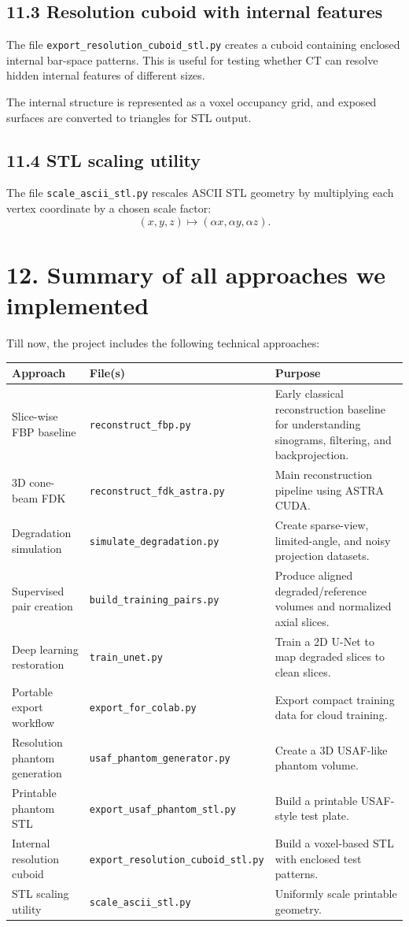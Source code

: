 \documentclass[12pt,a4paper]{article}
\begin{document}
\subsection*{11.3 Resolution cuboid with internal features}
The file \texttt{export\_resolution\_cuboid\_stl.py} creates a cuboid containing enclosed internal bar-space patterns. This is useful for testing whether CT can resolve hidden internal features of different sizes.

The internal structure is represented as a voxel occupancy grid, and exposed surfaces are converted to triangles for STL output.

\subsection*{11.4 STL scaling utility}
The file \texttt{scale\_ascii\_stl.py} rescales ASCII STL geometry by multiplying each vertex coordinate by a chosen scale factor:
\[
(x,y,z) \mapsto (\alpha x, \alpha y, \alpha z).
\]

\section*{12. Summary of all approaches we implemented}
Till now, the project includes the following technical approaches:

\begin{longtable}{|p{3.1cm}|p{4.0cm}|p{7.2cm}|}
\hline
\textbf{Approach} & \textbf{File(s)} & \textbf{Purpose} \\
\hline
Slice-wise FBP baseline & \texttt{reconstruct\_fbp.py} & Early classical reconstruction baseline for understanding sinograms, filtering, and backprojection. \\
\hline
3D cone-beam FDK & \texttt{reconstruct\_fdk\_astra.py} & Main reconstruction pipeline using ASTRA CUDA. \\
\hline
Degradation simulation & \texttt{simulate\_degradation.py} & Create sparse-view, limited-angle, and noisy projection datasets. \\
\hline
Supervised pair creation & \texttt{build\_training\_pairs.py} & Produce aligned degraded/reference volumes and normalized axial slices. \\
\hline
Deep learning restoration & \texttt{train\_unet.py} & Train a 2D U-Net to map degraded slices to clean slices. \\
\hline
Portable export workflow & \texttt{export\_for\_colab.py} & Export compact training data for cloud training. \\
\hline
Resolution phantom generation & \texttt{usaf\_phantom\_generator.py} & Create a 3D USAF-like phantom volume. \\
\hline
Printable phantom STL & \texttt{export\_usaf\_phantom\_stl.py} & Build a printable USAF-style test plate. \\
\hline
Internal resolution cuboid & \texttt{export\_resolution\_cuboid\_stl.py} & Build a voxel-based STL with enclosed test patterns. \\
\hline
STL scaling utility & \texttt{scale\_ascii\_stl.py} & Uniformly scale printable geometry. \\
\hline
\end{longtable}
\end{document}
